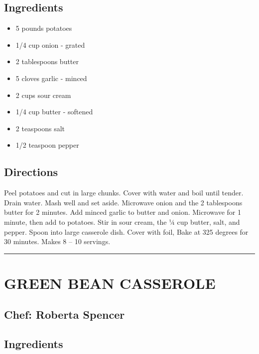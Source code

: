 \documentclass[
]{book}
\providecommand{\tightlist}{%
  \setlength{\itemsep}{0pt}\setlength{\parskip}{0pt}}
\begin{document}
\hypertarget{ingredients-30}{%
\subsection*{Ingredients}\label{ingredients-30}}


\begin{itemize}
\tightlist
\item
  5 pounds potatoes
\item
  1/4 cup onion - grated
\item
  2 tablespoons butter
\item
  5 cloves garlic - minced
\item
  2 cups sour cream
\item
  1/4 cup butter - softened
\item
  2 teaspoons salt
\item
  1/2 teaspoon pepper
\end{itemize}

\hypertarget{directions-30}{%
\subsection*{Directions}\label{directions-30}}


Peel potatoes and cut in large chunks. Cover with water and boil until tender.
Drain water. Mash well and set aside. Microwave onion and the 2 tablespoons
butter for 2 minutes. Add minced garlic to butter and onion. Microwave for
1 minute, then add to potatoes. Stir in sour cream, the ¼ cup butter, salt, and pepper.
Spoon into large casserole dish. Cover with foil, Bake at 325 degrees for 30 minutes.
Makes 8 -- 10 servings.

\begin{center}\rule{0.5\linewidth}{0.5pt}\end{center}

\hypertarget{green-bean-casserole}{%
\section*{GREEN BEAN CASSEROLE}\label{green-bean-casserole}}


\hypertarget{chef-roberta-spencer-6}{%
\subsection*{Chef: Roberta Spencer}\label{chef-roberta-spencer-6}}


\hypertarget{ingredients-31}{%
\subsection*{Ingredients}\label{ingredients-31}}
\end{document}
